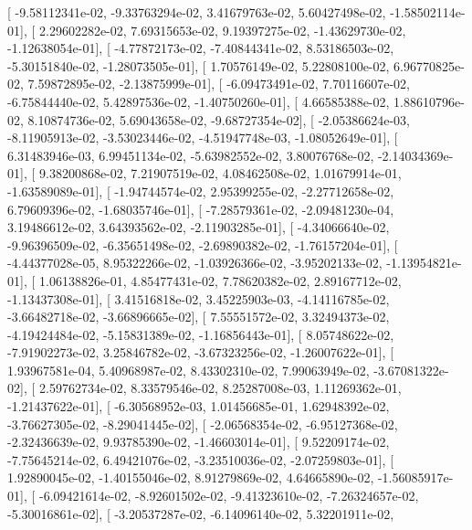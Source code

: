 \documentclass{article}
\begin{document}
       [ -9.58112341e-02,  -9.33763294e-02,   3.41679763e-02,
          5.60427498e-02,  -1.58502114e-01],
       [  2.29602282e-02,   7.69315653e-02,   9.19397275e-02,
         -1.43629730e-02,  -1.12638054e-01],
       [ -4.77872173e-02,  -7.40844341e-02,   8.53186503e-02,
         -5.30151840e-02,  -1.28073505e-01],
       [  1.70576149e-02,   5.22808100e-02,   6.96770825e-02,
          7.59872895e-02,  -2.13875999e-01],
       [ -6.09473491e-02,   7.70116607e-02,  -6.75844440e-02,
          5.42897536e-02,  -1.40750260e-01],
       [  4.66585388e-02,   1.88610796e-02,   8.10874736e-02,
          5.69043658e-02,  -9.68727354e-02],
       [ -2.05386624e-03,  -8.11905913e-02,  -3.53023446e-02,
         -4.51947748e-03,  -1.08052649e-01],
       [  6.31483946e-03,   6.99451134e-02,  -5.63982552e-02,
          3.80076768e-02,  -2.14034369e-01],
       [  9.38200868e-02,   7.21907519e-02,   4.08462508e-02,
          1.01679914e-01,  -1.63589089e-01],
       [ -1.94744574e-02,   2.95399255e-02,  -2.27712658e-02,
          6.79609396e-02,  -1.68035746e-01],
       [ -7.28579361e-02,  -2.09481230e-04,   3.19486612e-02,
          3.64393562e-02,  -2.11903285e-01],
       [ -4.34066640e-02,  -9.96396509e-02,  -6.35651498e-02,
         -2.69890382e-02,  -1.76157204e-01],
       [ -4.44377028e-05,   8.95322266e-02,  -1.03926366e-02,
         -3.95202133e-02,  -1.13954821e-01],
       [  1.06138826e-01,   4.85477431e-02,   7.78620382e-02,
          2.89167712e-02,  -1.13437308e-01],
       [  3.41516818e-02,   3.45225903e-03,  -4.14116785e-02,
         -3.66482718e-02,  -3.66896665e-02],
       [  7.55551572e-02,   3.32494373e-02,  -4.19424484e-02,
         -5.15831389e-02,  -1.16856443e-01],
       [  8.05748622e-02,  -7.91902273e-02,   3.25846782e-02,
         -3.67323256e-02,  -1.26007622e-01],
       [  1.93967581e-04,   5.40968987e-02,   8.43302310e-02,
          7.99063949e-02,  -3.67081322e-02],
       [  2.59762734e-02,   8.33579546e-02,   8.25287008e-03,
          1.11269362e-01,  -1.21437622e-01],
       [ -6.30568952e-03,   1.01456685e-01,   1.62948392e-02,
         -3.76627305e-02,  -8.29041445e-02],
       [ -2.06568354e-02,  -6.95127368e-02,  -2.32436639e-02,
          9.93785390e-02,  -1.46603014e-01],
       [  9.52209174e-02,  -7.75645214e-02,   6.49421076e-02,
         -3.23510036e-02,  -2.07259803e-01],
       [  1.92890045e-02,  -1.40155046e-02,   8.91279869e-02,
          4.64665890e-02,  -1.56085917e-01],
       [ -6.09421614e-02,  -8.92601502e-02,  -9.41323610e-02,
         -7.26324657e-02,  -5.30016861e-02],
       [ -3.20537287e-02,  -6.14096140e-02,   5.32201911e-02,
\end{document}

